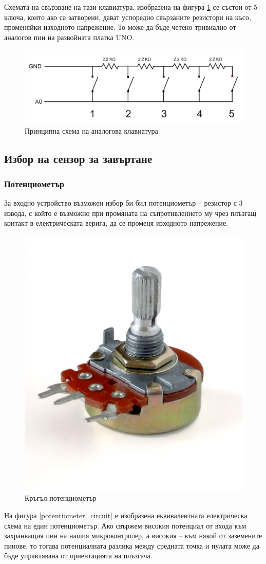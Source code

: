 \documentclass[titlepage, oneside, 12pt]{book}
\begin{document}
Схемата на свързване на тази клавиатура, изобразена на фигура \ref{keypad_circuit} се състои от 5 ключа, които ако са затворени,
дават успоредно свързаните резистори на късо, променяйки изходното напрежение. То може
да бъде четено тривиално от аналогов пин на развойната платка UNO.

\begin{figure}[h!]
    \label{keypad_circuit}
    \centering
    \includegraphics[width=0.5\linewidth]{img/keypad_circuit.png}
    \caption{Принципна схема на аналогова клавиатура}
\end{figure}

\subsection{Избор на сензор за завъртане}

\subsubsection{Потенциометър}

За входно устройство възможен избор би бил потенциометър \cite{potent} --
резистор с 3 извода, с който е възможно при промяната на съпротивлението му
чрез плъзгащ контакт в електрическата верига, да се променя изходното напрежение.

\begin{figure}[h!]
    \centering
    \includegraphics[width=0.3\linewidth]{img/potentiometer.png}
    \caption{Кръгъл потенциометър}
\end{figure}

На фигура \ref{potentiometer_circuit} е изобразена еквивалентната електрическа схема на един потенциометър.
Ако свържем високия потенциал от входа към захранващия пин на нашия микроконтролер,
а високия -- към някой от заземените пинове, то тогава потенциалната разлика между
средната точка и нулата може да бъде управлявана от ориентацията на плъзгача.
\end{document}
